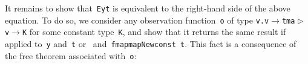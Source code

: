 \documentclass[9pt,authoryear]{sigplanconf}
\begin{document}
%
It remains to show that{~}\texttt{E}\texttt{\mbox{\hspace{0.50em}}}\texttt{y}\texttt{\mbox{\hspace{0.50em}}}\texttt{t} is equivalent to the right-hand
    side of the above equation. To do so, we consider any observation
    function{~}\texttt{o} of type \texttt{\makebox[1.22ex][c]{$ \forall $}}\texttt{\mbox{\hspace{0.50em}}}\texttt{v}\texttt{.}\texttt{\mbox{\hspace{0.50em}}}\texttt{v}\texttt{\mbox{\hspace{0.50em}}}\texttt{$ \rightarrow $}\texttt{\mbox{\hspace{0.50em}}}\texttt{tm}\texttt{\mbox{\hspace{0.50em}}}\texttt{\makebox[1.22ex][l]{$ {(} $}}\texttt{a}\texttt{\mbox{\hspace{0.50em}}}\texttt{$ \vartriangleright $}\texttt{\mbox{\hspace{0.50em}}}\texttt{v}\texttt{\makebox[1.22ex][r]{$ {)} $}}\texttt{\mbox{\hspace{0.50em}}}\texttt{$ \rightarrow $}\texttt{\mbox{\hspace{0.50em}}}\texttt{K} for some constant
    type{~}\texttt{K}, and show that it returns the same result if applied
    to{~}\texttt{y} and{~}\texttt{t} or{~}\texttt{\makebox[1.22ex][l]{$ {(} $}}\texttt{\makebox[1.22ex][r]{$ {)} $}} and{~}\texttt{fmap}\texttt{\mbox{\hspace{0.50em}}}\texttt{\makebox[1.22ex][l]{$ {(} $}}\texttt{mapNew}\texttt{\mbox{\hspace{0.50em}}}\texttt{\makebox[1.22ex][l]{$ {(} $}}\texttt{const}\texttt{\mbox{\hspace{0.50em}}}\texttt{\makebox[1.22ex][l]{$ {(} $}}\texttt{\makebox[1.22ex][r]{$ {)} $}}\texttt{\makebox[1.22ex][r]{$ {)} $}}\texttt{\makebox[1.22ex][r]{$ {)} $}}\texttt{{\nopagebreak \newline%
}\vphantom{$\{$}}\texttt{\mbox{\hspace{0.50em}}}\texttt{\mbox{\hspace{0.50em}}}\texttt{\mbox{\hspace{0.50em}}}\texttt{\mbox{\hspace{0.50em}}}\texttt{t}. This fact is a consequence of the free theorem associated
    with{~}\texttt{o}{:}%


%
%


{\nopagebreak }
\end{document}
